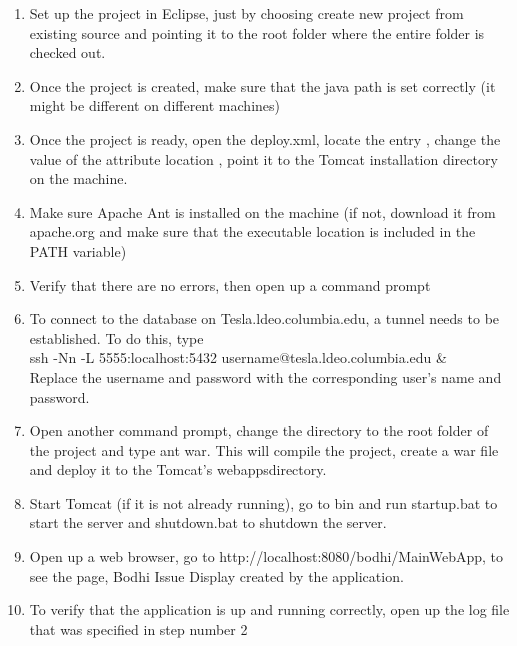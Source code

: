 \documentclass[amsart, 12pt]{article}
\begin{document}
\begin{enumerate}
\item Set up the project in Eclipse, just by choosing create new project from existing source and pointing it to the root folder where the entire folder is checked out.

\item Once the project is created, make sure that the java path is set correctly (it might be different on different machines)

\item Once the project is ready, open the deploy.xml, locate the entry , change the value of the attribute \textasciigrave location \textasciiacute, point it to the Tomcat installation directory on the machine.

\item Make sure Apache Ant is installed on the machine (if not, download it from apache.org and make sure that the executable location is included in the PATH variable)

\item Verify that there are no errors, then open up a command prompt

\item To connect to the database on Tesla.ldeo.columbia.edu, a tunnel needs to be established. To do this, type \\
ssh -Nn -L 5555:localhost:5432 username@tesla.ldeo.columbia.edu \& \\
Replace the username and password with the corresponding user's name and password.

\item Open another command prompt, change the directory to the root folder of  the project and type ant war. This will compile the project, create a war file and deploy it to the Tomcat's \textasciigrave webapps\textasciiacute directory.

\item Start Tomcat (if it is not already running), go to bin and run startup.bat to start the server and shutdown.bat to shutdown the server.

\item Open up a web browser, go to http://localhost:8080/bodhi/MainWebApp, to see the page, Bodhi Issue Display created by the application.

\item To verify that the application is up and running correctly, open up the log file that was specified in step number 2
\end{enumerate}
\end{document}
